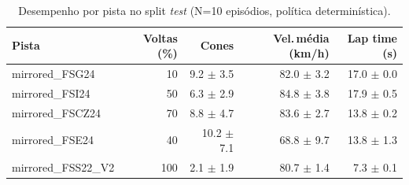 \begin{table}[H]
\centering
\caption{Desempenho por pista no split \textit{test} (N=10 episódios, política determinística).}
\label{tab:per_track_test}
\begin{tabular}{lrrrr}
\toprule
\textbf{Pista} & \textbf{Voltas (\%)} & \textbf{Cones} & \textbf{Vel.\,m\'edia (km/h)} & \textbf{Lap time (s)} \\
\midrule
mirrored_FSG24 & 10 & 9.2 $\pm$ 3.5 & 82.0 $\pm$ 3.2 & 17.0 $\pm$ 0.0 \\
mirrored_FSI24 & 50 & 6.3 $\pm$ 2.9 & 84.8 $\pm$ 3.8 & 17.9 $\pm$ 0.5 \\
mirrored_FSCZ24 & 70 & 8.8 $\pm$ 4.7 & 83.6 $\pm$ 2.7 & 13.8 $\pm$ 0.2 \\
mirrored_FSE24 & 40 & 10.2 $\pm$ 7.1 & 68.8 $\pm$ 9.7 & 13.8 $\pm$ 1.3 \\
mirrored_FSS22_V2 & 100 & 2.1 $\pm$ 1.9 & 80.7 $\pm$ 1.4 & 7.3 $\pm$ 0.1 \\
\bottomrule
\end{tabular}
\end{table}
